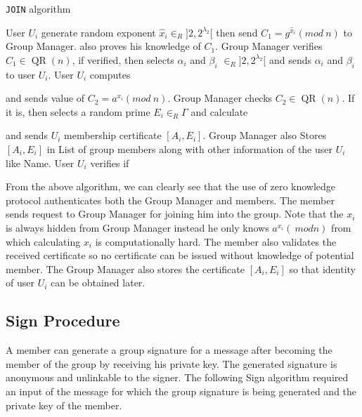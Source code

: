 \begin{algorithm}
\caption{\texttt{JOIN} algorithm}
\begin{algorithmic}[1]
\vspace{10pt}
\STATE User $U_i$ generate random exponent $\hat{x}_i \in_R ]2, 2^{\lambda_2}[$ then send $C_1 = g^{\hat{x}_i}(mod~n)$ to Group Manager. also proves his knowledge of $C_1$.
\STATE Group Manager verifies $C_1 \in \operatorname{QR}(n)$, if verified, then selects $\alpha_i$ and $\beta_i$ $\in_R ]2, 2^{\lambda_2}[$ and sends $\alpha_i$ and $\beta_i$ to user $U_i$.
\STATE User $U_i$ computes
\begin{center}
\end{center}
and sends value of $C_2 = a^{x_i}(mod~n)$.
\STATE Group Manager checks $C_2 \in \operatorname{QR}(n)$. If it is, then selects a random prime $E_i \in_R \Gamma$ and calculate
\begin{center}
\end{center} 
and sends $U_i$ membership certificate $[A_i, E_i]$.
\STATE Group Manager also Stores $[A_i, E_i]$ in List of group members along with other information of the user $U_i$ like Name.
\STATE User $U_i$ verifies if 
\begin{center}
\end{center} 
\vspace{10pt}
\end{algorithmic}
\end{algorithm}

From the above algorithm, we can clearly see that the use of zero knowledge protocol authenticates both the Group Manager and members. The member sends request to Group Manager for joining him into the group. Note that the $x_i$ is always hidden from Group Manager instead he only knows $a^{x_i} (~mod n)$ from which calculating $x_i$ is computationally hard. The member also validates the received certificate so no certificate can be issued without knowledge of potential member. The Group Manager also stores the certificate $[A_i, E_i]$ so that identity of user $U_i$ can be obtained later.

\subsection{Sign Procedure}\label{pro:sign}
 A member can generate a group signature for a message after becoming the member of the group by receiving his private key. The generated signature is anonymous and unlinkable to the signer. The following Sign algorithm required an input of the message for which the group signature is being generated and the private key of the member.

